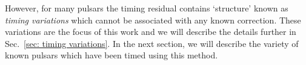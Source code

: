 However, for many pulsars the timing residual contains `structure' known as
\emph{timing variations} which cannot be associated with any known correction.
These variations are the focus of this work and we will describe the details
further in Sec.~\ref{sec: timing variations}.  In the next section, we will
describe the variety of known pulsars which have been timed using this method.


